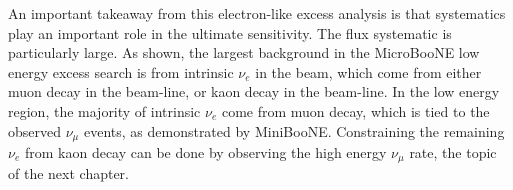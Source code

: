 An important takeaway from this electron-like excess analysis is that systematics play an important role in the ultimate sensitivity. The flux systematic is particularly large. As shown, the largest background in the MicroBooNE low energy excess search is from intrinsic $\nu_e$ in the beam, which come from either muon decay in the beam-line, or kaon decay in the beam-line. In the low energy region, the majority of intrinsic $\nu_e$ come from muon decay, which is tied to the observed $\nu_\mu$ events, as demonstrated by MiniBooNE. Constraining the remaining $\nu_e$ from kaon decay can be done by observing the high energy $\nu_\mu$ rate, the topic of the next chapter.

